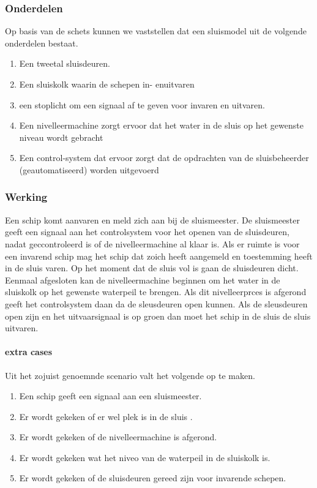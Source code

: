 \documentclass[11pt]{report} %
\begin{document}
 \subsubsection{Onderdelen}
 Op basis van de schets kunnen we vaststellen dat een sluismodel uit de volgende onderdelen bestaat.
 
 \begin{enumerate}
 	\item Een tweetal sluisdeuren. 
 	\item Een sluiskolk waarin de schepen in- enuitvaren
 	\item een stoplicht om een signaal af te geven voor invaren en uitvaren.
 	\item Een nivelleermachine zorgt ervoor dat het water in de sluis op het gewenste niveau wordt gebracht
 	\item Een control-system dat ervoor zorgt dat de opdrachten van de sluisbeheerder (geautomatiseerd) worden uitgevoerd
 \end{enumerate}
\subsubsection{Werking}

Een schip komt aanvaren en meld zich aan bij de sluismeester. De sluismeester geeft een signaal aan het controlsystem voor het openen van de sluisdeuren, nadat geccontroleerd is of de nivelleermachine al klaar is. Als er ruimte is voor een invarend schip mag het schip dat zoich heeft aangemeld en toestemming heeft  in de sluis varen. Op het moment dat de sluis vol is gaan de sluisdeuren dicht. Eenmaal afgesloten kan de nivelleermachine beginnen om het water in de sluiskolk op het gewenste waterpeil te brengen. Als dit nivelleerprces is afgerond geeft  het controlsystem daan da de sleusdeuren open kunnen.  Als de sleusdeuren open zijn en het uitvaarsignaal is op groen dan moet het schip in de sluis de sluis uitvaren.
 \paragraph{extra cases}
 Uit het zojuist genoemnde scenario valt het volgende op te maken.
  \begin{enumerate}
 	\item Een schip geeft een signaal aan een sluismeester.
 	\item Er wordt gekeken of er wel plek is in de sluis .
 	\item Er wordt gekeken of de nivelleermachine is afgerond.
 	\item Er wordt gekeken wat het niveo van de waterpeil in de sluiskolk is.
 	\item Er wordt gekeken of de sluisdeuren gereed zijn voor invarende schepen.
 \end{enumerate}
\end{document}
